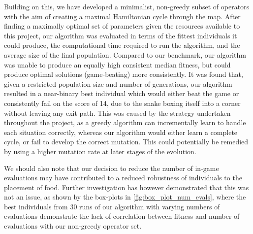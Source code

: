 \documentclass[british,10pt,a4paper]{article}
\begin{document}
Building on this, we have developed a minimalist, non-greedy subset of operators with the aim of creating a maximal Hamiltonian cycle through the map. After finding a maximally optimal set of parameters given the resources available to this project, our algorithm was evaluated in terms of the fittest individuals it could produce, the computational time required to run the algorithm, and the average size of the final population. Compared to our benchmark, our algorithm was unable to produce an equally high consistent median fitness, but could produce optimal solutions (game-beating) more consistently. It was found that, given a restricted population size and number of generations, our algorithm resulted in a near-binary best individual which would either beat the game or consistently fail on the score of 14, due to the snake boxing itself into a corner without leaving any exit path. This was caused by the strategy undertaken throughout the project, as a greedy algorithm can incrementally learn to handle each situation correctly, whereas our algorithm would either learn a complete cycle, or fail to develop the correct mutation. This could potentially be remedied by using a higher mutation rate at later stages of the evolution. 

We should also note that our decision to reduce the number of in-game evaluations may have contributed to a reduced robustness of individuals to the placement of food. Further investigation has however demonstrated that this was not an issue, as shown by the box-plots in \autoref{fig:box_plot_num_evals}, where the best individuals from 30 runs of our algorithm with varying numbers of evaluations demonstrate the lack of correlation between fitness and number of evaluations with our non-greedy operator set.
\end{document}
